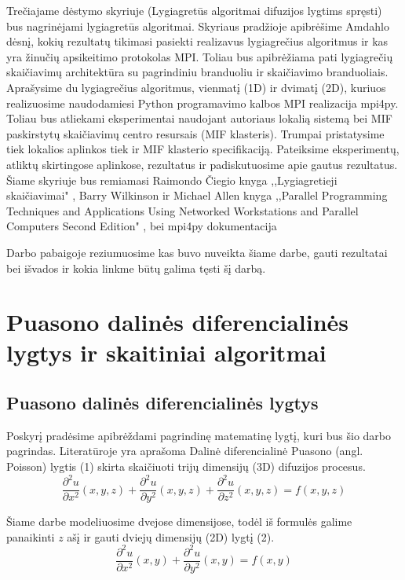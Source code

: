 \documentclass{VUMIFPSkursinis}
\begin{document}
Trečiajame dėstymo skyriuje (Lygiagretūs algoritmai difuzijos lygtims spręsti) bus nagrinėjami lygiagretūs algoritmai.
Skyriaus pradžioje apibrėšime Amdahlo dėsnį, kokių rezultatų tikimasi pasiekti realizavus lygiagrečius algoritmus ir kas yra žinučių apsikeitimo protokolas MPI.
Toliau bus apibrėžiama pati lygiagrečių skaičiavimų architektūra su pagrindiniu branduoliu ir skaičiavimo branduoliais.
Aprašysime du lygiagrečius algoritmus, vienmatį (1D) ir dvimatį (2D), kuriuos realizuosime naudodamiesi Python programavimo kalbos MPI realizacija mpi4py.
Toliau bus atliekami eksperimentai naudojant autoriaus lokalią sistemą bei MIF paskirstytų skaičiavimų centro resursais (MIF klasteris). 
Trumpai pristatysime tiek lokalios aplinkos tiek ir MIF klasterio specifikaciją.
Pateiksime eksperimentų, atliktų skirtingose aplinkose, rezultatus ir padiskutuosime apie gautus rezultatus.
Šiame skyriuje bus remiamasi Raimondo Čiegio knyga ,,Lygiagretieji skaičiavimai" \cite{Lygeg}, Barry Wilkinson ir Michael Allen knyga ,,Parallel Programming Techniques and Applications Using Networked Workstations and Parallel Computers Second Edition" \cite{Par}, bei mpi4py dokumentacija \cite{Mpi}


Darbo pabaigoje reziumuosime kas buvo nuveikta šiame darbe, gauti rezultatai bei išvados ir kokia linkme būtų galima tęsti šį darbą. 
\pagebreak
\section{Puasono dalinės diferencialinės lygtys ir skaitiniai algoritmai}
\subsection{Puasono dalinės diferencialinės lygtys}
Poskyrį pradėsime apibrėždami pagrindinę matematinę lygtį, kuri bus šio darbo pagrindas.
Literatūroje \cite{NumAnal} yra aprašoma Dalinė diferencialinė Puasono (angl. Poisson) lygtis (1) skirta skaičiuoti trijų dimensijų (3D) difuzijos procesus.
\begin{equation}
\frac{\partial^{2} u}{\partial x^{2}} (x, y, z) + \frac{\partial^{2} u}{\partial y^{2}} (x, y, z) + \frac{\partial^{2} u}{\partial z^{2}} (x, y, z) = f(x, y, z)
\end{equation}



Šiame darbe modeliuosime dvejose dimensijose, todėl iš formulės galime panaikinti $z$ ašį ir gauti dviejų dimensijų (2D) lygtį (2).
\begin{equation}
\frac{\partial^{2} u}{\partial x^{2}} (x, y) + \frac{\partial^{2} u}{\partial y^{2}} (x, y) = f(x,y)
\end{equation}
\end{document}
